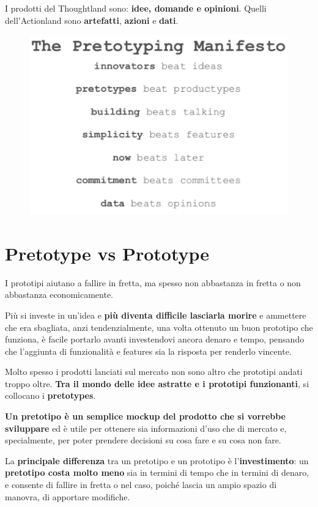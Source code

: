 \documentclass[a4paper,11pt,oneside]{book}
\begin{document}
I prodotti del Thoughtland sono: \textbf{idee, domande e opinioni}. Quelli dell'Actionland sono \textbf{artefatti}, \textbf{azioni} e \textbf{dati}.

\begin{figure}[!h]
	\centering
	\includegraphics[scale=0.6]{immagini/Manifesto.png}
\end{figure}

\section{Pretotype vs Prototype}
I prototipi aiutano a fallire in fretta, ma spesso non abbastanza in fretta o non abbastanza economicamente.

Più si investe in un'idea e \textbf{più diventa difficile lasciarla morire} e ammettere che era sbagliata, anzi tendenzialmente, una volta ottenuto un buon prototipo che funziona, è facile portarlo avanti investendovi ancora denaro e tempo, pensando che l'aggiunta di funzionalità e features sia la risposta per renderlo vincente.

Molto spesso i prodotti lanciati sul mercato non sono altro che prototipi andati troppo oltre. \textbf{Tra il mondo delle idee astratte e i prototipi funzionanti}, si collocano i \textbf{pretotypes}.

\textbf{Un pretotipo è un semplice mockup del prodotto che si vorrebbe sviluppare} ed è utile per ottenere sia informazioni d'uso che di mercato e, specialmente, per poter prendere decisioni su cosa fare e su cosa non fare.

La \textbf{principale differenza} tra un pretotipo e un prototipo è l'\textbf{investimento}: un \textbf{pretotipo costa molto meno} sia in termini di tempo che in termini di denaro, e consente di fallire in fretta o nel caso, poiché lascia un ampio spazio di manovra, di apportare modifiche.
\end{document}
